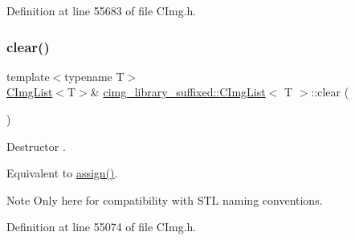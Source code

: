 Definition at line 55683 of file C\+Img.\+h.

\mbox{\label{structcimg__library__suffixed_1_1CImgList_a55a72d7cb35865a81afeb4ef8c57fa20}} 
\subsubsection{\texorpdfstring{clear()}{clear()}}
{\footnotesize\ttfamily template$<$typename T$>$ \\
\hyperlink{structcimg__library__suffixed_1_1CImgList}{C\+Img\+List}$<$T$>$\& \hyperlink{structcimg__library__suffixed_1_1CImgList}{cimg\+\_\+library\+\_\+suffixed\+::\+C\+Img\+List}$<$ T $>$\+::clear (\begin{DoxyParamCaption}{ }\end{DoxyParamCaption})\hspace{0.3cm}{\ttfamily [inline]}}



Destructor . 

Equivalent to \hyperlink{structcimg__library__suffixed_1_1CImgList_a8fbb044c1ccfe53144c926308f02279e}{assign()}. \begin{DoxyNote}{Note}
Only here for compatibility with S\+TL naming conventions. 
\end{DoxyNote}


Definition at line 55074 of file C\+Img.\+h.

\mbox{\label{structcimg__library__suffixed_1_1CImgList_ab8eb768b6d541a9daff4fee1c6eac8f1}} 
